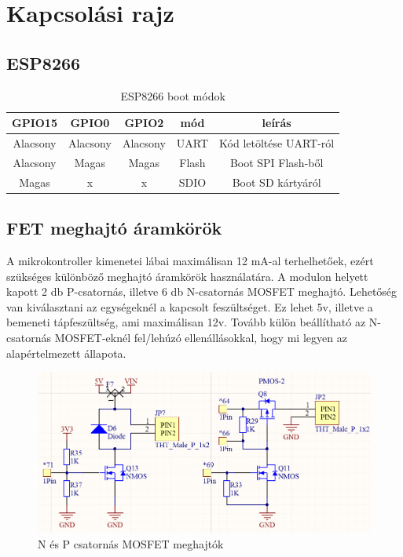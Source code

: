 \section{Kapcsolási rajz}

\subsection{ESP8266}

\begin{table}[ht]
	\footnotesize
	\centering
	\begin{tabular}{ | c | c | c | c | c |}
		\toprule
		GPIO15 & GPIO0 & GPIO2 & mód & leírás \\
		\midrule
        Alacsony & Alacsony & Alacsony & UART & Kód letöltése UART-ról \\
        \hline
        Alacsony & Magas & Magas & Flash & Boot SPI Flash-ből \\
        \hline
		Magas & x  & x & SDIO & Boot SD kártyáról \\
		\bottomrule
	\end{tabular}
	\caption{ESP8266 boot módok}
	\label{tab:TabularExample}
\end{table}

\subsection{FET meghajtó áramkörök}
A mikrokontroller kimenetei lábai maximálisan 12 mA-al terhelhetőek, ezért szükséges különböző meghajtó áramkörök használatára. A modulon helyett kapott 2 db P-csatornás, illetve 6 db N-csatornás MOSFET meghajtó. Lehetőség van kiválasztani az egységeknél a kapcsolt feszültséget. Ez lehet 5v, illetve a bemeneti tápfeszültség, ami maximálisan 12v. Tovább külön beállítható az N-csatornás MOSFET-eknél fel/lehúzó ellenállásokkal, hogy mi legyen az alapértelmezett állapota.
\begin{figure}[!h]
    \centering
    \includegraphics[width=150mm, keepaspectratio]{figures/n_p_driver.png}
    \caption{N és P csatornás MOSFET meghajtók}
    \label{fig:TeXstudio}
\end{figure}

